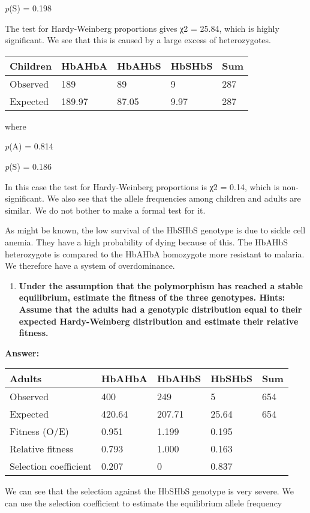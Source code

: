 \documentclass[]{article}
\providecommand{\tightlist}{%
  \setlength{\itemsep}{0pt}\setlength{\parskip}{0pt}}
\begin{document}
\emph{p}(S) = 0.198

The test for Hardy-Weinberg proportions gives χ2 = 25.84, which is
highly significant. We see that this is caused by a large excess of
heterozygotes.

\begin{longtable}[]{@{}lllll@{}}
\toprule
Children & HbAHbA & HbAHbS & HbSHbS & Sum\tabularnewline
\midrule
\endhead
Observed & 189 & 89 & 9 & 287\tabularnewline
Expected & 189.97 & 87.05 & 9.97 & 287\tabularnewline
\bottomrule
\end{longtable}

where

\emph{p}(A) = 0.814

\emph{p}(S) = 0.186

In this case the test for Hardy-Weinberg proportions is χ2 = 0.14, which
is non-significant. We also see that the allele frequencies among
children and adults are similar. We do not bother to make a formal test
for it.

As might be known, the low survival of the HbSHbS genotype is due to
sickle cell anemia. They have a high probability of dying because of
this. The HbAHbS heterozygote is compared to the HbAHbA homozygote more
resistant to malaria. We therefore have a system of overdominance.

\begin{enumerate}
\def\labelenumi{\arabic{enumi})}
\setcounter{enumi}{2}
\tightlist
\item
  \textbf{Under the assumption that the polymorphism has reached a
  stable equilibrium, estimate the fitness of the three genotypes.
  Hints: Assume that the adults had a genotypic distribution equal to
  their expected Hardy-Weinberg distribution and estimate their relative
  fitness.}
\end{enumerate}

\textbf{Answer:}

\begin{longtable}[]{@{}lllll@{}}
\toprule
Adults & HbAHbA & HbAHbS & HbSHbS & Sum\tabularnewline
\midrule
\endhead
Observed & 400 & 249 & 5 & 654\tabularnewline
Expected & 420.64 & 207.71 & 25.64 & 654\tabularnewline
Fitness (O/E) & 0.951 & 1.199 & 0.195 &\tabularnewline
Relative fitness & 0.793 & 1.000 & 0.163 &\tabularnewline
Selection coefficient & 0.207 & 0 & 0.837 &\tabularnewline
\bottomrule
\end{longtable}

We can see that the selection against the HbSHbS genotype is very
severe. We can use the selection coefficient to estimate the equilibrium
allele frequency
\end{document}

